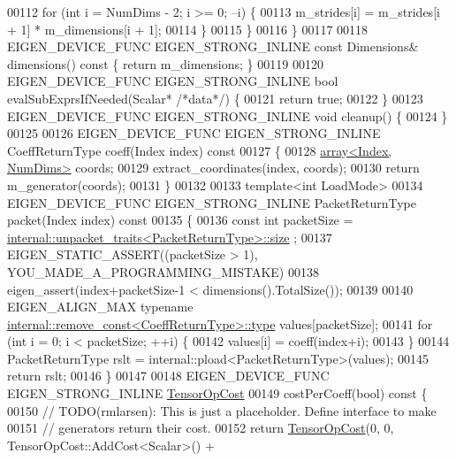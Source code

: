\begin{DoxyCode}
00112       \textcolor{keywordflow}{for} (\textcolor{keywordtype}{int} i = NumDims - 2; i >= 0; --i) \{
00113         m\_strides[i] = m\_strides[i + 1] * m\_dimensions[i + 1];
00114       \}
00115     \}
00116   \}
00117 
00118   EIGEN\_DEVICE\_FUNC EIGEN\_STRONG\_INLINE \textcolor{keyword}{const} Dimensions& dimensions()\textcolor{keyword}{ const }\{ \textcolor{keywordflow}{return} m\_dimensions; \}
00119 
00120   EIGEN\_DEVICE\_FUNC EIGEN\_STRONG\_INLINE \textcolor{keywordtype}{bool} evalSubExprsIfNeeded(Scalar* \textcolor{comment}{/*data*/}) \{
00121     \textcolor{keywordflow}{return} \textcolor{keyword}{true};
00122   \}
00123   EIGEN\_DEVICE\_FUNC EIGEN\_STRONG\_INLINE \textcolor{keywordtype}{void} cleanup() \{
00124   \}
00125 
00126   EIGEN\_DEVICE\_FUNC EIGEN\_STRONG\_INLINE CoeffReturnType coeff(Index index)\textcolor{keyword}{ const}
00127 \textcolor{keyword}{  }\{
00128     \hyperlink{class_eigen_1_1array}{array<Index, NumDims>} coords;
00129     extract\_coordinates(index, coords);
00130     \textcolor{keywordflow}{return} m\_generator(coords);
00131   \}
00132 
00133   \textcolor{keyword}{template}<\textcolor{keywordtype}{int} LoadMode>
00134   EIGEN\_DEVICE\_FUNC EIGEN\_STRONG\_INLINE PacketReturnType packet(Index index)\textcolor{keyword}{ const}
00135 \textcolor{keyword}{  }\{
00136     \textcolor{keyword}{const} \textcolor{keywordtype}{int} packetSize = \hyperlink{struct_eigen_1_1internal_1_1unpacket__traits}{internal::unpacket\_traits<PacketReturnType>::size}
      ;
00137     EIGEN\_STATIC\_ASSERT((packetSize > 1), YOU\_MADE\_A\_PROGRAMMING\_MISTAKE)
00138     eigen\_assert(index+packetSize-1 < dimensions().TotalSize());
00139 
00140     EIGEN\_ALIGN\_MAX \textcolor{keyword}{typename} \hyperlink{group___sparse_core___module}{internal::remove\_const<CoeffReturnType>::type}
       values[packetSize];
00141     \textcolor{keywordflow}{for} (\textcolor{keywordtype}{int} i = 0; i < packetSize; ++i) \{
00142       values[i] = coeff(index+i);
00143     \}
00144     PacketReturnType rslt = internal::pload<PacketReturnType>(values);
00145     \textcolor{keywordflow}{return} rslt;
00146   \}
00147 
00148   EIGEN\_DEVICE\_FUNC EIGEN\_STRONG\_INLINE \hyperlink{class_eigen_1_1_tensor_op_cost}{TensorOpCost}
00149   costPerCoeff(\textcolor{keywordtype}{bool})\textcolor{keyword}{ const }\{
00150     \textcolor{comment}{// TODO(rmlarsen): This is just a placeholder. Define interface to make}
00151     \textcolor{comment}{// generators return their cost.}
00152     \textcolor{keywordflow}{return} \hyperlink{class_eigen_1_1_tensor_op_cost}{TensorOpCost}(0, 0, TensorOpCost::AddCost<Scalar>() +

\end{DoxyCode}
